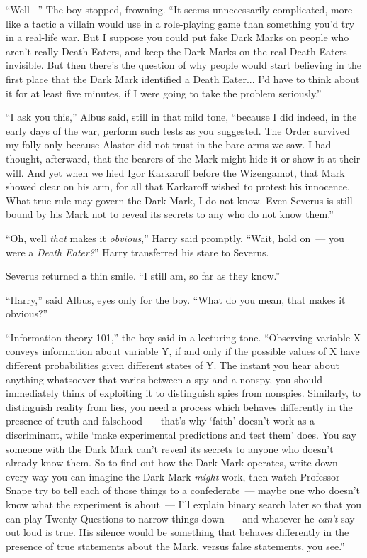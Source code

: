 ``Well~-'' The boy stopped, frowning. ``It seems unnecessarily complicated, more like a tactic a villain would use in a role-playing game than something you'd try in a real-life war. But I suppose you could put fake Dark Marks on people who aren't really Death Eaters, and keep the Dark Marks on the real Death Eaters invisible. But then there's the question of why people would start believing in the first place that the Dark Mark identified a Death Eater... I'd have to think about it for at least five minutes, if I were going to take the problem seriously.''

``I ask you this,'' Albus said, still in that mild tone, ``because I did indeed, in the early days of the war, perform such tests as you suggested. The Order survived my folly only because Alastor did not trust in the bare arms we saw. I had thought, afterward, that the bearers of the Mark might hide it or show it at their will. And yet when we hied Igor Karkaroff before the Wizengamot, that Mark showed clear on his arm, for all that Karkaroff wished to protest his innocence. What true rule may govern the Dark Mark, I do not know. Even Severus is still bound by his Mark not to reveal its secrets to any who do not know them.''

``Oh, well \emph{that} makes it \emph{obvious},'' Harry said promptly. ``Wait, hold on~--- you were a \emph{Death Eater?}'' Harry transferred his stare to Severus.

Severus returned a thin smile. ``I still am, so far as they know.''

``Harry,'' said Albus, eyes only for the boy. ``What do you mean, that makes it obvious?''

``Information theory 101,'' the boy said in a lecturing tone. ``Observing variable X conveys information about variable Y, if and only if the possible values of X have different probabilities given different states of Y. The instant you hear about anything whatsoever that varies between a spy and a nonspy, you should immediately think of exploiting it to distinguish spies from nonspies. Similarly, to distinguish reality from lies, you need a process which behaves differently in the presence of truth and falsehood~--- that's why `faith' doesn't work as a discriminant, while `make experimental predictions and test them' does. You say someone with the Dark Mark can't reveal its secrets to anyone who doesn't already know them. So to find out how the Dark Mark operates, write down every way you can imagine the Dark Mark \emph{might} work, then watch Professor Snape try to tell each of those things to a confederate~--- maybe one who doesn't know what the experiment is about~--- I'll explain binary search later so that you can play Twenty Questions to narrow things down~--- and whatever he \emph{can't} say out loud is true. His silence would be something that behaves differently in the presence of true statements about the Mark, versus false statements, you see.''

